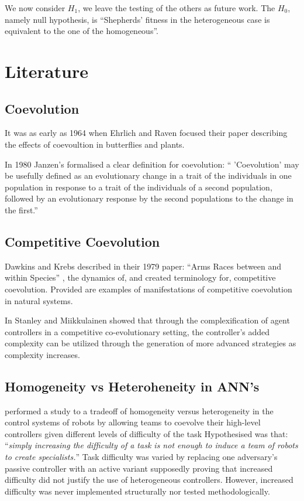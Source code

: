 \documentclass[conference]{IEEEtran}
\begin{document}
We now consider $H_1$, we leave the testing of the others as future work. The $H_0$, namely null hypothesis, is ``Shepherds’ fitness in the heterogeneous case is equivalent to the one of the homogeneous''.

\section{Literature}
 
\subsection{Coevolution}
It was as early as 1964 when Ehrlich and Raven focused their paper \cite{ehrlich1964butterflies} describing the effects of coevoultion in butterflies and plants.

In 1980 Janzen's \cite{janzen1980coevolution} formalised a clear definition for coevolution:
`` 'Coevolution' may be usefully defined as an evolutionary change in a trait of the individuals in one population in response to a trait of the individuals of a second population, followed by an evolutionary response by the second populations to the change in the first.''


\subsection{Competitive Coevolution}
Dawkins and Krebs described in their 1979 paper: ``Arms Races between and within Species'' \cite{dawkins1979arms}, the dynamics of, and created terminology for, competitive coevolution. Provided are examples of manifestations of competitive coevolution in natural systems.

In \cite{stanley2004competitive} Stanley and Miikkulainen showed that through the complexification of agent controllers in a competitive co-evolutionary setting, the controller's added complexity can be utilized through the generation of more advanced strategies as complexity increases.


\subsection{Homogeneity vs Heteroheneity in ANN's}
\cite{potter2001heterogeneity} performed a study to a tradeoff of homogeneity versus heterogeneity in the control systems of robots by allowing teams to coevolve their high-level controllers given different levels of difficulty of the task
Hypothesised was that: ``\textit{simply increasing the difficulty of a task is not enough to induce a team of robots to create specialists.}''
Task difficulty was varied by replacing one adversary's passive controller with an active variant supposedly proving that increased difficulty did not justify the use of heterogeneous controllers.
However, increased difficulty was never implemented structurally nor tested methodologically. 
\end{document}
